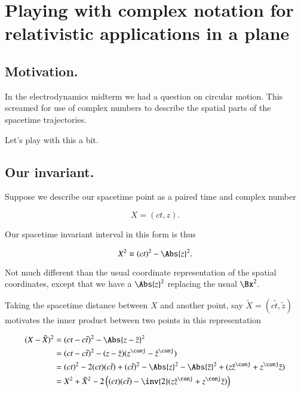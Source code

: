 %
%

\chapter{Playing with complex notation for relativistic applications in a plane}
\label{chap:complexPlanarBoost}
{}
\date{Mar 8, 2011}

\beginArtNoToc

\section{Motivation.}

In the electrodynamics midterm we had a question on circular motion.  This screamed for use of complex numbers to describe the spatial parts of the spacetime trajectories.

Let's play with this a bit.

\section{Our invariant.}

Suppose we describe our spacetime point as a paired time and complex number

\begin{equation}\label{eqn:complexPlanarBoost:10}
X = (ct, z).
\end{equation}

Our spacetime invariant interval in this form is thus

\begin{equation}\label{eqn:complexPlanarBoost:30}
X^2 \equiv (ct)^2 - \Abs{z}^2.
\end{equation}

Not much different than the usual coordinate representation of the spatial coordinates, except that we have a $\Abs{z}^2$ replacing the usual $\Bx^2$.

Taking the spacetime distance between $X$ and another point, say $\tilde{X} = ( c \tilde{t}, \tilde{z})$ motivates the inner product between two points in this representation

\begin{align*}
(X - \tilde{X})^2 
&= (ct - c \tilde{t})^2 - \Abs{z - \tilde{z}}^2 \\
&= (ct - c \tilde{t})^2 - (z - \tilde{z})(z^\conj - \tilde{z}^\conj) \\
&= (ct)^2 - 2 (ct) (c \tilde{t}) + (c \tilde{t})^2 
- \Abs{z}^2 - \Abs{\tilde{z}}^2 + (z \tilde{z}^\conj + z^\conj \tilde{z}) \\
&= X^2 + \tilde{X}^2 - 2 \left( (ct) (c \tilde{t}) - \inv{2}(z \tilde{z}^\conj + z^\conj \tilde{z}) \right) \\
\end{align*}

